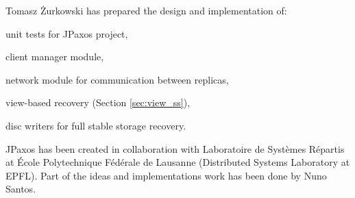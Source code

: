 \noindent Tomasz Żurkowski has prepared the design and implementation of:
\begin{tightList}
  \item[\textbullet] unit tests for JPaxos project,
  \item[\textbullet] client manager module, 
  \item[\textbullet] network module for communication between replicas,
  \item[\textbullet] view-based recovery (Section \ref{sec:view_ss}),
  \item[\textbullet] disc writers for full stable storage recovery.
\end{tightList}

\noindent JPaxos has been created in collaboration with Laboratoire de Systèmes Répartis at École Polytechnique Fédérale de Lausanne (Distributed Systems Laboratory at EPFL). Part of the ideas and implementations work has been done by Nuno Santos.


